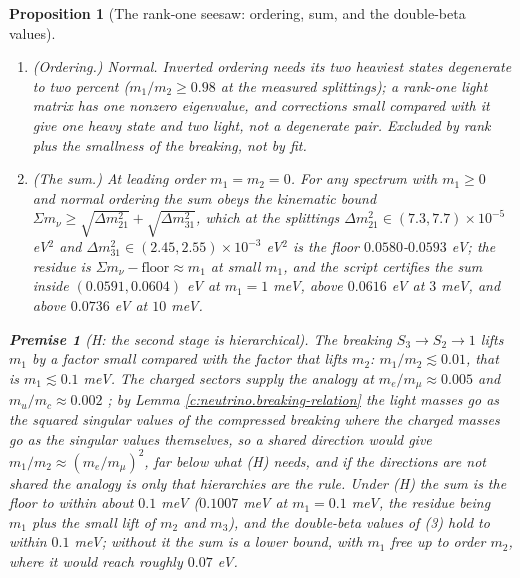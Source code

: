 \documentclass[11pt]{article}
\newtheorem{proposition}[theorem]{Proposition}
\theoremstyle{definition}
\newtheorem{premise}[theorem]{Premise}
\theoremstyle{plain}
\providecommand{\mnu}{}\renewcommand{\mnu}{\Sigma m_{\nu}}
\begin{document}
\begin{proposition}[The rank-one seesaw: ordering, sum, and the double-beta values]
\begin{enumerate}
\item \emph{(Ordering.)} Normal. Inverted ordering needs its two heaviest states degenerate to two percent ($m_{1}/m_{2} \ge 0.98$ at the measured splittings); a rank-one light matrix has one nonzero eigenvalue, and corrections small compared with it give one heavy state and two light, not a degenerate pair. Excluded by rank plus the smallness of the breaking, not by fit.
\item \emph{(The sum.)} At leading order $m_{1} = m_{2} = 0$. For any spectrum with $m_{1} \ge 0$ and normal ordering the sum obeys the kinematic bound $\mnu \ge \sqrt{\Delta m^{2}_{21}} + \sqrt{\Delta m^{2}_{31}}$, which at the splittings $\Delta m^{2}_{21} \in (7.3, 7.7) \times 10^{-5}$ eV$^{2}$ and $\Delta m^{2}_{31} \in (2.45, 2.55) \times 10^{-3}$ eV$^{2}$ \cite{PDG2024, NuFIT2024} is the floor $0.0580$-$0.0593$ eV; the residue is $\mnu - \text{floor} \approx m_{1}$ at small $m_{1}$, and the script certifies the sum inside $(0.0591, 0.0604)$ eV at $m_{1} = 1$ meV, above $0.0616$ eV at $3$ meV, and above $0.0736$ eV at $10$ meV.
\end{enumerate}
\begin{premise}[H: the second stage is hierarchical]
The breaking $S_{3} \to S_{2} \to 1$ lifts $m_{1}$ by a factor small compared with the factor that lifts $m_{2}$: $m_{1}/m_{2} \lesssim 0.01$, that is $m_{1} \lesssim 0.1$ meV. The charged sectors supply the analogy at $m_{e}/m_{\mu} \approx 0.005$ and $m_{u}/m_{c} \approx 0.002$ \cite{PDG2024}; by Lemma \ref{c:neutrino.breaking-relation} the light masses go as the \emph{squared} singular values of the compressed breaking where the charged masses go as the singular values themselves, so a shared direction would give $m_{1}/m_{2} \approx (m_{e}/m_{\mu})^{2}$, far below what (H) needs, and if the directions are not shared the analogy is only that hierarchies are the rule. Under (H) the sum is the floor to within about $0.1$ meV ($0.1007$ meV at $m_{1} = 0.1$ meV, the residue being $m_{1}$ plus the small lift of $m_{2}$ and $m_{3}$), and the double-beta values of (3) hold to within $0.1$ meV; without it the sum is a lower bound, with $m_{1}$ free up to order $m_{2}$, where it would reach roughly $0.07$ eV.
\end{premise}
\begin{enumerate}
\setcounter{enumi}{2}

\end{enumerate}
\end{proposition}
\end{document}
